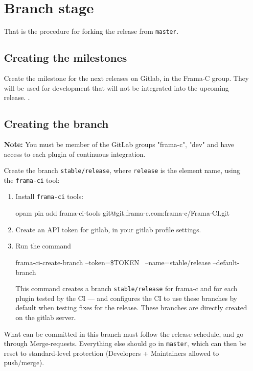 \chapter{Branch stage}
\label{chap:branch}

That is the procedure for forking the release from \texttt{master}.

\section{Creating the milestones}
\label{sec:creating-milestones}

Create the milestone for the next releases on \textsf{Gitlab},
in the Frama-C group. They will be used for development that will not
be integrated into the upcoming release.
.

\section{Creating the branch}
\label{sec:creating-branch}

\textbf{Note:} You must be member of the GitLab groups "frama-c", "dev" and have
access to each plugin of continuous integration.

Create the branch \texttt{stable/release}, where \texttt{release} is the
element name, using the \texttt{frama-ci} tool:
\begin{enumerate}
\item Install \texttt{frama-ci} tools:
\begin{shell}
opam pin add frama-ci-tools git@git.frama-c.com:frama-c/Frama-CI.git
\end{shell}
\item Create an API token for gitlab, in your gitlab profile settings.
\item Run the command
\begin{shell}
frama-ci-create-branch --token=\$TOKEN \
--name=stable/release --default-branch
\end{shell}
This command creates a branch \texttt{stable/release} for frama-c and for
each plugin tested by the CI — and configures the CI to use these branches
by default when testing fixes for the release.
These branches are directly created on the gitlab server.
\end{enumerate}
What can be committed in this branch must follow the release schedule,
and go through Merge-requests. Everything else should go in \texttt{master},
which can then be reset to standard-level protection (Developers + Maintainers
allowed to push/merge).

